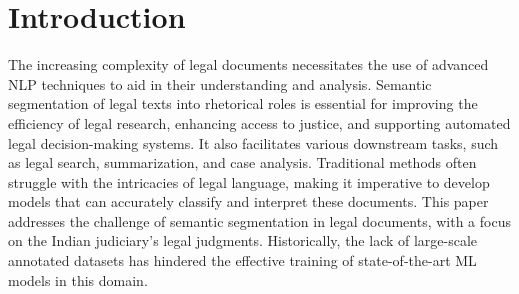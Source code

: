 \section{Introduction}
The increasing complexity of legal documents necessitates the use of advanced NLP techniques to aid in their understanding and analysis. Semantic segmentation of legal texts into rhetorical roles is essential for improving the efficiency of legal research, enhancing access to justice, and supporting automated legal decision-making systems. It also facilitates various downstream tasks, such as legal search, summarization, and case analysis. Traditional methods often struggle with the intricacies of legal language, making it imperative to develop models that can accurately classify and interpret these documents. This paper addresses the challenge of semantic segmentation in legal documents, with a focus on the Indian judiciary’s legal judgments. Historically, the lack of large-scale annotated datasets has hindered the effective training of state-of-the-art ML models in this domain.

